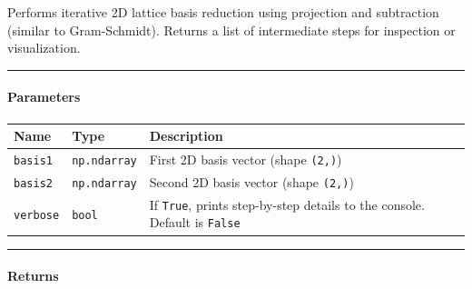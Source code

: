 \documentclass[a4paper,12pt]{article}
\begin{document}
    \begin{tcolorbox}[
    width=\linewidth,       
    left=10mm, right=10mm,
    top=1mm, bottom=1mm,
    breakable,
]
	

Performs iterative 2D lattice basis reduction using projection and
subtraction (similar to Gram-Schmidt). Returns a list of intermediate
steps for inspection or visualization.

\begin{center}\rule{0.5\linewidth}{0.5pt}\end{center}

\paragraph{Parameters}\label{parameters}

\begin{longtable}[]{@{}
  >{\raggedright\arraybackslash}p{}
  >{\raggedright\arraybackslash}p{}
  >{\raggedright\arraybackslash}p{}@{}}
\toprule\noalign{}
\begin{minipage}[b]{\linewidth}\raggedright
Name
\end{minipage} & \begin{minipage}[b]{\linewidth}\raggedright
Type
\end{minipage} & \begin{minipage}[b]{\linewidth}\raggedright
Description
\end{minipage} \\
\midrule\noalign{}
\endhead
\bottomrule\noalign{}
\endlastfoot
\texttt{basis1} & \texttt{np.ndarray} & First 2D basis vector (shape
\texttt{(2,)}) \\
\texttt{basis2} & \texttt{np.ndarray} & Second 2D basis vector (shape
\texttt{(2,)}) \\
\texttt{verbose} & \texttt{bool} & If \texttt{True}, prints step-by-step
details to the console. Default is \texttt{False} \\
\end{longtable}

\begin{center}\rule{0.5\linewidth}{0.5pt}\end{center}

\paragraph{ Returns}\label{returns}


\end{tcolorbox}
\end{document}
